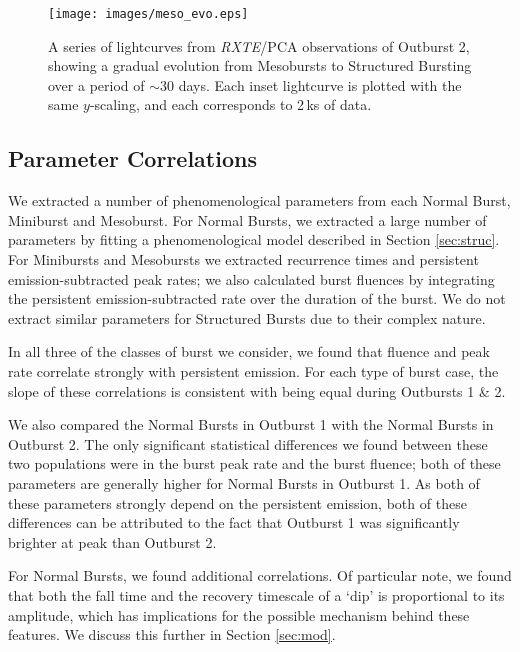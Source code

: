 \begin{figure}
  \centering
  \texttt{[image: images/meso\_evo.eps]}
  \caption{\small A series of lightcurves from \textit{RXTE}/PCA observations of Outburst 2, showing a gradual evolution from Mesobursts to Structured Bursting over a period of $\sim30$ days.  Each inset lightcurve is plotted with the same $y$-scaling, and each corresponds to 2\,ks of data.}
  \label{fig:meso_to_struc}
\end{figure}

\subsection{Parameter Correlations}

\par We extracted a number of phenomenological parameters from each Normal Burst, Miniburst and Mesoburst.  For Normal Bursts, we extracted a large number of parameters by fitting a phenomenological model described in Section \ref{sec:struc}.  For Minibursts and Mesobursts we extracted recurrence times and persistent emission-subtracted peak rates; we also calculated burst fluences by integrating the persistent emission-subtracted rate over the duration of the burst.  We do not extract similar parameters for Structured Bursts due to their complex nature.
\par  In all three of the classes of burst we consider, we found that fluence and peak rate correlate strongly with persistent emission.  For each type of burst case, the slope of these correlations is consistent with being equal during Outbursts 1 \& 2.
\par We also compared the Normal Bursts in Outburst 1 with the Normal Bursts in Outburst 2.  The only significant statistical differences we found between these two populations were in the burst peak rate and the burst fluence; both of these parameters are generally higher for Normal Bursts in Outburst 1.  As both of these parameters strongly depend on the persistent emission, both of these differences can be attributed to the fact that Outburst 1 was significantly brighter at peak than Outburst 2.
\par For Normal Bursts, we found additional correlations.  Of particular note, we found that both the fall time and the recovery timescale of a `dip' is proportional to its amplitude, which has implications for the possible mechanism behind these features.  We discuss this further in Section \ref{sec:mod}.
